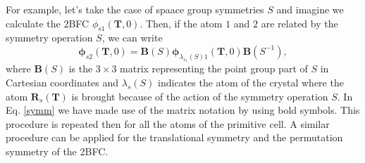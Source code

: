 For example, let's take the case of spaace group symmetries $S$ and imagine we calculate the 2BFC 
$\phi_{s1}(\mathbf{T}, 0)$. Then, if the atom $1$ and $2$ are related by the symmetry 
operation $S$, we can write 
\begin{equation}
\label{symm}
\boldsymbol{\phi}_{s2}(\mathbf{T},0)=\mathbf{B}(S)\boldsymbol{\phi}_{\lambda_{s_{1}}(S)1}(\mathbf{T},0)\mathbf{B}(S^{-1}),
\end{equation}
where $\mathbf{B}(S)$ is the $3\times3$ matrix representing the point group part of $S$ in Cartesian coordinates and 
$\lambda_{s}(S)$ indicates the atom of the crystal where the atom $\mathbf{R}_{s}(\mathbf{T})$ is brought because of 
the action of the symmetry operation $S$. In Eq. \ref{symm} we have made use of the matrix notation by using bold symbols. This procedure is repeated then for all the atoms of the primitive cell. A similar procedure can be applied for the translational symmetry and the permutation symmetry of the 2BFC. \\



